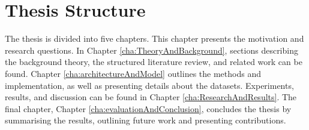 \section{Thesis Structure}
\label{sec:thesisStructure}
The thesis is divided into five chapters. This chapter presents the motivation and research questions. In Chapter \ref{cha:TheoryAndBackground}, sections describing the background theory, the structured literature review, and related work can be found. Chapter \ref{cha:architectureAndModel} outlines the methods and implementation, as well as presenting details about the datasets. Experiments, results, and discussion can be found in Chapter \ref{cha:ResearchAndResults}. The final chapter, Chapter \ref{cha:evaluationAndConclusion}, concludes the thesis by summarising the results, outlining future work and presenting contributions.
